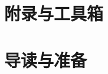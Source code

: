 \documentclass[fontsize=12pt, paper=a4, twoside, openright, DIV=calc]{scrbook}
\theoremstyle{break}
\begin{document}
\chapter{附录与工具箱}
% 

\chapter{导读与准备}
% 




\end{document}
